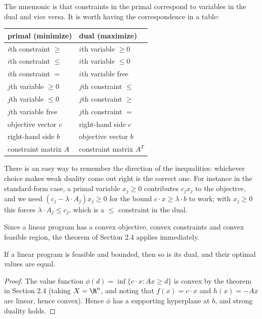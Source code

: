 \documentclass[a4paper]{scrartcl}
\begin{document}
The mnemonic is that constraints in the primal correspond to variables in the dual and vice versa. It is worth having the correspondence in a table:
\begin{center}
\begin{tabular}{l|l}
    primal (minimize) & dual (maximize)\\\hline
    $i$th constraint $\geq$ & $i$th variable $\geq 0$\\
    $i$th constraint $\leq$ & $i$th variable $\leq 0$\\
    $i$th constraint $=$ & $i$th variable free\\\hline
    $j$th variable $\geq 0$ & $j$th constraint $\leq$\\
    $j$th variable $\leq 0$ & $j$th constraint $\geq$\\
    $j$th variable free & $j$th constraint $=$\\\hline
    objective vector $c$ & right-hand side $c$\\
    right-hand side $b$ & objective vector $b$\\
    constraint matrix $A$ & constraint matrix $A^T$
\end{tabular}
\end{center}
There is an easy way to remember the direction of the inequalities: whichever choice makes weak duality come out right is the correct one. For instance in the standard-form case, a primal variable $x_j \geq 0$ contributes $c_jx_j$ to the objective, and we need $(c_j - \lambda\cdot A_j)x_j \geq 0$ for the bound $c\cdot x \geq \lambda\cdot b$ to work; with $x_j \geq 0$ this forces $\lambda\cdot A_j \leq c_j$, which is a $\leq$ constraint in the dual.

Since a linear program has a convex objective, convex constraints and convex feasible region, the theorem of Section 2.4 applies immediately.

\begin{theorem}
    If a linear program is feasible and bounded, then so is its dual, and their optimal values are equal.
\end{theorem}
\begin{proof}
    The value function $\phi(d) = \inf\{c\cdot x : Ax \geq d\}$ is convex by the theorem in Section 2.4 (taking $X = \R^n$, and noting that $f(x) = c\cdot x$ and $h(x) = -Ax$ are linear, hence convex). Hence $\phi$ has a supporting hyperplane at $b$, and strong duality holds.
\end{proof}
\end{document}
